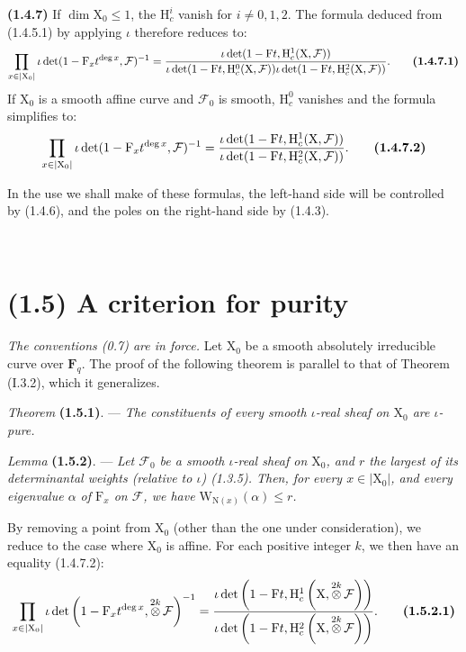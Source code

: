 \documentclass[11pt,leqno]{article}
\newcommand{\Page}[1]{\ifvmode\noindent\else\unskip\ \fi{\footnotesize\textcolor{gray}{[p.\,#1]}}\ \ignorespaces}
\begin{document}
\textbf{(1.4.7)} If \(\dim\mathrm{X}_0\le1\), the \(\mathrm{H}_c^i\) vanish for \(i\ne0,1,2\). The formula deduced from (1.4.5.1) by applying \(\iota\) therefore reduces to:
\[
\prod_{x\in|\mathrm{X}_0|}
\iota\det(1-\mathrm{F}_x t^{\deg x},\mathcal{F})^{-1}
=
\frac{\iota\det(1-\mathrm{F}t,\mathrm{H}_c^1(\mathrm{X},\mathcal{F}))}
{\iota\det(1-\mathrm{F}t,\mathrm{H}_c^0(\mathrm{X},\mathcal{F}))
 \iota\det(1-\mathrm{F}t,\mathrm{H}_c^2(\mathrm{X},\mathcal{F}))}.
\tag*{\textbf{(1.4.7.1)}}
\]
If \(\mathrm{X}_0\) is a smooth affine curve and \(\mathcal{F}_0\) is smooth, \(\mathrm{H}_c^0\) vanishes and the formula simplifies to:
\[
\prod_{x\in|\mathrm{X}_0|}
\iota\det(1-\mathrm{F}_x t^{\deg x},\mathcal{F})^{-1}
=
\frac{\iota\det(1-\mathrm{F}t,\mathrm{H}_c^1(\mathrm{X},\mathcal{F}))}
{\iota\det(1-\mathrm{F}t,\mathrm{H}_c^2(\mathrm{X},\mathcal{F}))}.
\tag*{\textbf{(1.4.7.2)}}
\]

In the use we shall make of these formulas, the left-hand side will be controlled by (1.4.6), and the poles on the right-hand side by (1.4.3).

\Page{164}
\section*{(1.5) A criterion for purity}

\textit{The conventions \textup{(0.7)} are in force.} Let \(\mathrm{X}_0\) be a smooth absolutely irreducible curve over \(\mathbf{F}_q\). The proof of the following theorem is parallel to that of Theorem (I.3.2), which it generalizes.

\textit{Theorem} \textbf{(1.5.1)}. — \textit{The constituents of every smooth \(\iota\)-real sheaf on \(\mathrm{X}_0\) are \(\iota\)-pure.}

\textit{Lemma} \textbf{(1.5.2)}. — \textit{Let \(\mathcal{F}_0\) be a smooth \(\iota\)-real sheaf on \(\mathrm{X}_0\), and \(r\) the largest of its determinantal weights (relative to \(\iota\)) \textup{(1.3.5)}. Then, for every \(x\in|\mathrm{X}_0|\), and every eigenvalue \(\alpha\) of \(\mathrm{F}_x\) on \(\mathcal{F}\), we have \(\mathrm{W}_{\mathrm{N}(x)}(\alpha)\le r\).}

By removing a point from \(\mathrm{X}_0\) (other than the one under consideration), we reduce to the case where \(\mathrm{X}_0\) is affine. For each positive integer \(k\), we then have an equality (1.4.7.2):
\[
\prod_{x\in|\mathrm{X}_0|}
\iota\det\left(1-\mathrm{F}_x t^{\deg x},
 \mathop{\otimes}\limits^{2k}\mathcal{F}\right)^{-1}
=
\frac{\iota\det\left(1-\mathrm{F}t,
 \mathrm{H}_c^1\left(\mathrm{X},\mathop{\otimes}\limits^{2k}\mathcal{F}\right)\right)}
{\iota\det\left(1-\mathrm{F}t,
 \mathrm{H}_c^2\left(\mathrm{X},\mathop{\otimes}\limits^{2k}\mathcal{F}\right)\right)}.
\tag*{\textbf{(1.5.2.1)}}
\]
\end{document}
